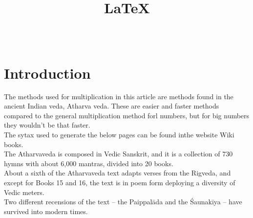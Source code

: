 \documentclass[12pt,a4paper]{article}
\title{\LaTeX}
\author{
	\hspace{4in}{Dheeraj Athrey}\\
}
\begin{document}
\maketitle


\section*{Introduction}


The methods used for multiplication in this article are methods found in the ancient Indian veda, Atharva veda\cite{bloomfield1899atharvaveda}\cite{India1000shaping}. These are easier and faster methods compared to the general multiplication method forl numbers, but for big numbers they wouldn't be that faster.\\
The sytax used to generate the below pages can be found inthe website Wiki books\cite{website:Wikibooks}.\\


The Atharvaveda is composed in Vedic Sanskrit, and it is a collection of 730 hymns with about 6,000 mantras, divided into 20 books.\\
About a sixth of the Atharvaveda text adapts verses from the Rigveda, and except for Books 15 and 16, the text is in poem form deploying a diversity of Vedic meters.\\

Two different recensions of the text – the Paippalāda and the Śaunakīya – have survived into modern times.\\





\end{document}
